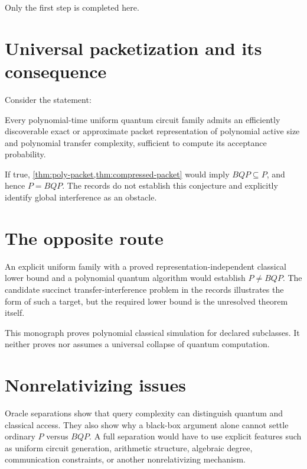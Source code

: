 Only the first step is completed here.

\section{Universal packetization and its consequence}
Consider the statement:

\begin{conjecture}
Every polynomial-time uniform quantum circuit family admits an efficiently discoverable exact or approximate packet representation of polynomial active size and polynomial transfer complexity, sufficient to compute its acceptance probability.
\end{conjecture}

If true, \cref{thm:poly-packet,thm:compressed-packet} would imply $BQP\subseteq P$, and hence $P=BQP$. The records do not establish this conjecture and explicitly identify global interference as an obstacle.

\section{The opposite route}
An explicit uniform family with a proved representation-independent classical lower bound and a polynomial quantum algorithm would establish $P\neq BQP$. The candidate succinct transfer-interference problem in the records illustrates the form of such a target, but the required lower bound is the unresolved theorem itself.

\begin{scopebox}
This monograph proves polynomial classical simulation for declared subclasses. It neither proves nor assumes a universal collapse of quantum computation.
\end{scopebox}

\section{Nonrelativizing issues}
Oracle separations show that query complexity can distinguish quantum and classical access. They also show why a black-box argument alone cannot settle ordinary $P$ versus $BQP$. A full separation would have to use explicit features such as uniform circuit generation, arithmetic structure, algebraic degree, communication constraints, or another nonrelativizing mechanism.
